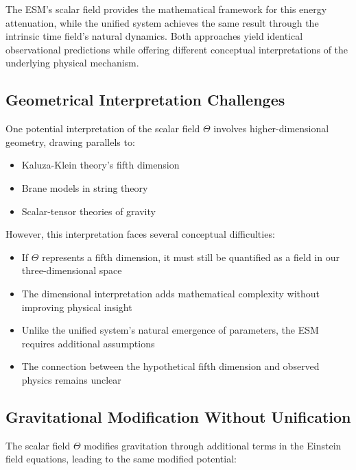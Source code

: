 	The ESM's scalar field provides the mathematical framework for this energy attenuation, while the unified system achieves the same result through the intrinsic time field's natural dynamics. Both approaches yield identical observational predictions while offering different conceptual interpretations of the underlying physical mechanism.
	
	\subsection{Geometrical Interpretation Challenges}
	\label{subsec:geometrical_challenges}
	
	One potential interpretation of the scalar field $\Theta$ involves higher-dimensional geometry, drawing parallels to:
	
	\begin{itemize}
		\item Kaluza-Klein theory's fifth dimension \cite{Kaluza1921,Klein1926}
		\item Brane models in string theory \cite{Randall1999}
		\item Scalar-tensor theories of gravity \cite{Brans1961}
	\end{itemize}
	
	However, this interpretation faces several conceptual difficulties:
	
	\begin{itemize}
		\item If $\Theta$ represents a fifth dimension, it must still be quantified as a field in our three-dimensional space
		\item The dimensional interpretation adds mathematical complexity without improving physical insight
		\item Unlike the unified system's natural emergence of parameters, the ESM requires additional assumptions
		\item The connection between the hypothetical fifth dimension and observed physics remains unclear
	\end{itemize}
	
	\subsection{Gravitational Modification Without Unification}
	\label{subsec:gravitational_modification_esm}
	
	The scalar field $\Theta$ modifies gravitation through additional terms in the Einstein field equations, leading to the same modified potential:
	
